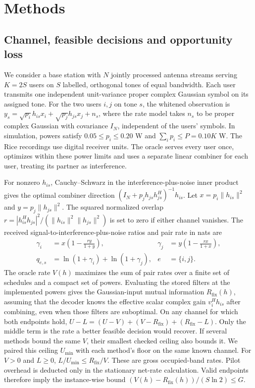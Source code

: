 \documentclass[11pt,letterpaper]{article}
\newcommand{\fix}{R_{\mathrm{fix}}}
\begin{document}
\section*{Methods}
\subsection*{Channel, feasible decisions and opportunity loss}
We consider a base station with \(N\) jointly processed antenna streams serving \(K=2S\) users on \(S\) labelled, orthogonal tones of equal bandwidth. Each user transmits one independent unit-variance proper complex Gaussian symbol on its assigned tone. For the two users \(i,j\) on tone \(s\), the whitened observation is \(y_s=\sqrt{p_i}h_{is}x_i+\sqrt{p_j}h_{js}x_j+n_s\), where the rate model takes \(n_s\) to be proper complex Gaussian with covariance \(I_N\), independent of the users' symbols. In simulation, powers satisfy \(0.05\leq p_i\leq0.20\) W and \(\sum_i p_i\leq P=0.10K\) W. The Rice recordings use digital receiver units. The oracle serves every user once, optimizes within these power limits and uses a separate linear combiner for each user, treating its partner as interference.

For nonzero \(h_{is}\), Cauchy--Schwarz in the interference-plus-noise inner product gives the optimal combiner direction \((I_N+p_j h_{js}h_{js}^{H})^{-1}h_{is}\). Let \(x=p_i\|h_{is}\|^2\) and \(y=p_j\|h_{js}\|^2\). The squared normalized overlap \(r=|h_{is}^{H}h_{js}|^2/(\|h_{is}\|^2\|h_{js}\|^2)\) is set to zero if either channel vanishes. The received signal-to-interference-plus-noise ratios and pair rate in nats are
\begin{equation}
\begin{aligned}
\gamma_i &= x\left(1-\frac{r y}{1+y}\right), &
\gamma_j &= y\left(1-\frac{r x}{1+x}\right),\\
q_{e,s} &= \ln(1+\gamma_i)+\ln(1+\gamma_j), & e&=\{i,j\}.
\end{aligned}
\label{eq:sinr}
\end{equation}
The oracle rate \(V(h)\) maximizes the sum of pair rates over a finite set of schedules and a compact set of powers. Evaluating the stored filters at the implemented powers gives the Gaussian-input mutual information \(\fix(h)\), assuming that the decoder knows the effective scalar complex gain \(v_i^Hh_{is}\) after combining, even when those filters are suboptimal. On any channel for which both endpoints hold, \(U-L=(U-V)+(V-\fix)+(\fix-L)\). Only the middle term is the rate a better feasible decision would recover. If several methods bound the same \(V\), their smallest checked ceiling also bounds it. We paired this ceiling \(U_{\min}\) with each method's floor on the same known channel. For \(V>0\) and \(L\ge0\), \(L/U_{\min}\le\fix/V\). These are gross occupied-band rates. Pilot overhead is deducted only in the stationary net-rate calculation. Valid endpoints therefore imply the instance-wise bound \((V(h)-\fix(h))/(S\ln 2)\leq G\).
\end{document}

